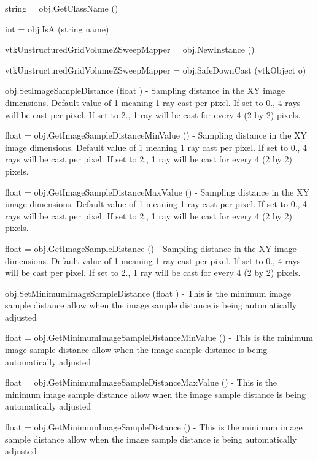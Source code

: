 \begin{DoxyItemize}
\item {\ttfamily string = obj.\-Get\-Class\-Name ()}  
\item {\ttfamily int = obj.\-Is\-A (string name)}  
\item {\ttfamily vtk\-Unstructured\-Grid\-Volume\-Z\-Sweep\-Mapper = obj.\-New\-Instance ()}  
\item {\ttfamily vtk\-Unstructured\-Grid\-Volume\-Z\-Sweep\-Mapper = obj.\-Safe\-Down\-Cast (vtk\-Object o)}  
\item {\ttfamily obj.\-Set\-Image\-Sample\-Distance (float )} -\/ Sampling distance in the X\-Y image dimensions. Default value of 1 meaning 1 ray cast per pixel. If set to 0., 4 rays will be cast per pixel. If set to 2., 1 ray will be cast for every 4 (2 by 2) pixels.  
\item {\ttfamily float = obj.\-Get\-Image\-Sample\-Distance\-Min\-Value ()} -\/ Sampling distance in the X\-Y image dimensions. Default value of 1 meaning 1 ray cast per pixel. If set to 0., 4 rays will be cast per pixel. If set to 2., 1 ray will be cast for every 4 (2 by 2) pixels.  
\item {\ttfamily float = obj.\-Get\-Image\-Sample\-Distance\-Max\-Value ()} -\/ Sampling distance in the X\-Y image dimensions. Default value of 1 meaning 1 ray cast per pixel. If set to 0., 4 rays will be cast per pixel. If set to 2., 1 ray will be cast for every 4 (2 by 2) pixels.  
\item {\ttfamily float = obj.\-Get\-Image\-Sample\-Distance ()} -\/ Sampling distance in the X\-Y image dimensions. Default value of 1 meaning 1 ray cast per pixel. If set to 0., 4 rays will be cast per pixel. If set to 2., 1 ray will be cast for every 4 (2 by 2) pixels.  
\item {\ttfamily obj.\-Set\-Minimum\-Image\-Sample\-Distance (float )} -\/ This is the minimum image sample distance allow when the image sample distance is being automatically adjusted  
\item {\ttfamily float = obj.\-Get\-Minimum\-Image\-Sample\-Distance\-Min\-Value ()} -\/ This is the minimum image sample distance allow when the image sample distance is being automatically adjusted  
\item {\ttfamily float = obj.\-Get\-Minimum\-Image\-Sample\-Distance\-Max\-Value ()} -\/ This is the minimum image sample distance allow when the image sample distance is being automatically adjusted  
\item {\ttfamily float = obj.\-Get\-Minimum\-Image\-Sample\-Distance ()} -\/ This is the minimum image sample distance allow when the image sample distance is being automatically adjusted  

\end{DoxyItemize}
